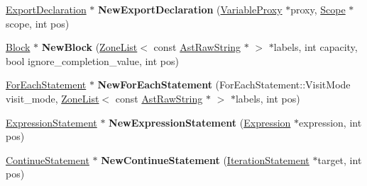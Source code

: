 \begin{DoxyCompactItemize}
\item 
\hyperlink{classv8_1_1internal_1_1_export_declaration}{Export\+Declaration} $\ast$ {\bfseries New\+Export\+Declaration} (\hyperlink{classv8_1_1internal_1_1_variable_proxy}{Variable\+Proxy} $\ast$proxy, \hyperlink{classv8_1_1internal_1_1_scope}{Scope} $\ast$scope, int pos)\hypertarget{classv8_1_1internal_1_1_b_a_s_e___e_m_b_e_d_d_e_d_a839824c6921b533dfd156953e45f9cac}{}\label{classv8_1_1internal_1_1_b_a_s_e___e_m_b_e_d_d_e_d_a839824c6921b533dfd156953e45f9cac}

\item 
\hyperlink{classv8_1_1internal_1_1_block}{Block} $\ast$ {\bfseries New\+Block} (\hyperlink{classv8_1_1internal_1_1_zone_list}{Zone\+List}$<$ const \hyperlink{classv8_1_1internal_1_1_ast_raw_string}{Ast\+Raw\+String} $\ast$ $>$ $\ast$labels, int capacity, bool ignore\+\_\+completion\+\_\+value, int pos)\hypertarget{classv8_1_1internal_1_1_b_a_s_e___e_m_b_e_d_d_e_d_ad70049416a4aecf1449740cc04e924e8}{}\label{classv8_1_1internal_1_1_b_a_s_e___e_m_b_e_d_d_e_d_ad70049416a4aecf1449740cc04e924e8}

\item 
\hyperlink{classv8_1_1internal_1_1_for_each_statement}{For\+Each\+Statement} $\ast$ {\bfseries New\+For\+Each\+Statement} (For\+Each\+Statement\+::\+Visit\+Mode visit\+\_\+mode, \hyperlink{classv8_1_1internal_1_1_zone_list}{Zone\+List}$<$ const \hyperlink{classv8_1_1internal_1_1_ast_raw_string}{Ast\+Raw\+String} $\ast$ $>$ $\ast$labels, int pos)\hypertarget{classv8_1_1internal_1_1_b_a_s_e___e_m_b_e_d_d_e_d_a215edb2f94f234b7d8e620425cdcc1c4}{}\label{classv8_1_1internal_1_1_b_a_s_e___e_m_b_e_d_d_e_d_a215edb2f94f234b7d8e620425cdcc1c4}

\item 
\hyperlink{classv8_1_1internal_1_1_expression_statement}{Expression\+Statement} $\ast$ {\bfseries New\+Expression\+Statement} (\hyperlink{classv8_1_1internal_1_1_expression}{Expression} $\ast$expression, int pos)\hypertarget{classv8_1_1internal_1_1_b_a_s_e___e_m_b_e_d_d_e_d_ae9a0eccb58baeee537534f7646c9fc18}{}\label{classv8_1_1internal_1_1_b_a_s_e___e_m_b_e_d_d_e_d_ae9a0eccb58baeee537534f7646c9fc18}

\item 
\hyperlink{classv8_1_1internal_1_1_continue_statement}{Continue\+Statement} $\ast$ {\bfseries New\+Continue\+Statement} (\hyperlink{classv8_1_1internal_1_1_iteration_statement}{Iteration\+Statement} $\ast$target, int pos)\hypertarget{classv8_1_1internal_1_1_b_a_s_e___e_m_b_e_d_d_e_d_abbf6e4a422b8b6e6511f5cf0b5e49a25}{}\label{classv8_1_1internal_1_1_b_a_s_e___e_m_b_e_d_d_e_d_abbf6e4a422b8b6e6511f5cf0b5e49a25}


\end{DoxyCompactItemize}

